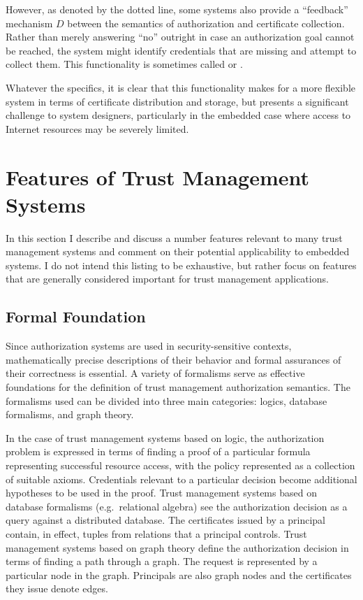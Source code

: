 However, as denoted by the dotted line, some systems also provide a ``feedback'' mechanism $D$
between the semantics of authorization and certificate collection. Rather than merely answering
``no'' outright in case an authorization goal cannot be reached, the system might identify
credentials that are missing and attempt to collect them. This functionality is sometimes called
 \cite{Li:DCDTM} or  \cite{Gunter:PDCR}.

Whatever the specifics, it is clear that this functionality makes for a more flexible system in
terms of certificate distribution and storage, but presents a significant challenge to system
designers, particularly in the embedded case where access to Internet resources may be severely
limited.

\section{Features of Trust Management Systems}
\label{section-features}

In this section I describe and discuss a number features relevant to many trust management
systems and comment on their potential applicability to embedded systems. I do not intend this
listing to be exhaustive, but rather focus on features that are generally considered important
for trust management applications.

\subsection{Formal Foundation}

Since authorization systems are used in security-sensitive contexts, mathematically precise
descriptions of their behavior and formal assurances of their correctness is essential. A
variety of formalisms serve as effective foundations for the definition of trust management
authorization semantics. The formalisms used can be divided into three main categories: logics,
database formalisms, and graph theory.

In the case of trust management systems based on logic, the authorization problem is expressed
in terms of finding a proof of a particular formula representing successful resource access,
with the policy represented as a collection of suitable axioms. Credentials relevant to a
particular decision become additional hypotheses to be used in the proof. Trust management
systems based on database formalisms (e.g.~relational algebra) see the authorization decision as
a query against a distributed database. The certificates issued by a principal contain, in
effect, tuples from relations that a principal controls. Trust management systems based on graph
theory define the authorization decision in terms of finding a path through a graph. The request
is represented by a particular node in the graph. Principals are also graph nodes and the
certificates they issue denote edges.

